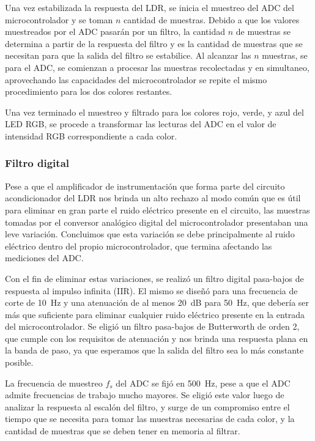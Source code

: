 \documentclass[12pt,a4paper,twoside,fleqn]{article}
\begin{document}
Una vez estabilizada la respuesta del LDR, se inicia el muestreo del ADC del microcontrolador y se toman $n$ cantidad de muestras. Debido a que los valores muestreados por el ADC pasarán por un filtro, la cantidad $n$ de muestras se determina a partir de la respuesta del filtro y es la cantidad de muestras que se necesitan para que la salida del filtro se estabilice. Al alcanzar las $n$ muestras, se para el ADC, se comienzan a procesar las muestras recolectadas y en simultaneo, aprovechando las capacidades del microcontrolador se repite el mismo procedimiento para los dos colores restantes. 

Una vez terminado el muestreo y filtrado para los colores rojo, verde, y azul del LED RGB, se procede a transformar las lecturas del ADC en el valor de intensidad RGB correspondiente a cada color.

\subsubsection*{Filtro digital}
Pese a que el amplificador de instrumentación que forma parte del circuito acondicionador del LDR nos brinda un alto rechazo al modo común que es útil para eliminar en gran parte el ruido eléctrico presente en el circuito, las muestras tomadas por el conversor analógico digital del microcontrolador presentaban una leve variación. Concluimos que esta variación se debe principalmente al ruido eléctrico dentro del propio microcontrolador, que termina afectando las mediciones del ADC.

Con el fin de eliminar estas variaciones, se realizó un filtro digital pasa-bajos de respuesta al impulso infinita (IIR). El mismo se diseñó para una frecuencia de corte de \qty{10}{\Hz} y una atenuación de al menos \qty{20}{\dB} para \qty{50}{\Hz}, que debería ser más que suficiente para eliminar cualquier ruido eléctrico presente en la entrada del microcontrolador. Se eligió un filtro pasa-bajos de Butterworth de orden 2, que cumple con los requisitos de atenuación y nos brinda una respuesta plana en la banda de paso, ya que esperamos que la salida del filtro sea lo más constante posible.

La frecuencia de muestreo $f_s$ del ADC se fijó en \qty{500}{\Hz}, pese a que el ADC admite frecuencias de trabajo mucho mayores. Se eligió este valor luego de analizar la respuesta al escalón del filtro, y surge de un compromiso entre el tiempo que se necesita para tomar las muestras necesarias de cada color, y la cantidad de muestras que se deben tener en memoria al filtrar.
\end{document}
